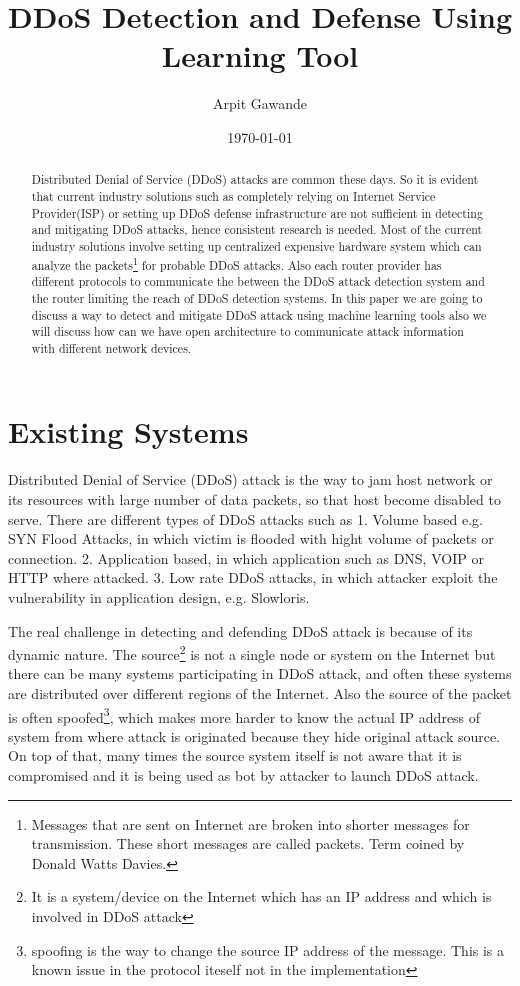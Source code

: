 \documentclass[10pt,oneside,a4paper]{article}
\author{Arpit Gawande}
\title{DDoS Detection and Defense Using Learning Tool}
\date{\today}
\begin{document}
\begin{abstract}
Distributed Denial of Service (DDoS) attacks are common these days\cite{ddosattacknews}. So it is evident that current industry solutions such as completely relying on Internet Service Provider(ISP) or setting up DDoS defense infrastructure are not sufficient in detecting and mitigating DDoS attacks, hence consistent research is needed. Most of the current industry solutions involve setting up centralized expensive hardware system which can analyze the packets\footnote{Messages that are sent on Internet are broken into shorter messages for transmission. These short messages are called packets. Term coined by Donald Watts Davies.} \cite{networkdatapacket} for probable DDoS attacks. Also each router provider has different protocols to communicate the between the DDoS attack detection system and the router limiting the reach of DDoS detection systems. In this paper we are going to discuss a way to detect and mitigate DDoS attack using machine learning tools also we will discuss how can we have open architecture to communicate attack information with different network devices.
\end{abstract}

\section{Existing Systems}

Distributed Denial of Service (DDoS) attack is the way to jam host network or its resources with large number of data packets, so that host become disabled to serve. There are different types of DDoS attacks such as
1. Volume based e.g. SYN Flood Attacks, in which victim is flooded with hight volume of packets or connection.
2. Application based, in which application such as DNS, VOIP or HTTP where attacked.
3. Low rate DDoS attacks, in which attacker exploit the vulnerability in application design, e.g. Slowloris.
\cite{DDoSAttacks}

The real challenge in detecting and defending DDoS attack is because of its dynamic nature. The source\footnote{It is a system/device on the Internet which has an IP address and which is involved in DDoS attack} is not a single node or system on the Internet but there can be many systems participating in DDoS attack, and often these systems are distributed over different regions of the Internet. Also the source of the packet is often spoofed\footnote{spoofing is the way to change the source IP address of the message. This is a known issue in the protocol iteself not in the implementation}\cite{ipspoofing}, which makes more harder to know the actual IP address of system from where attack is originated because they hide original attack source. On top of that, many times the source system itself is not aware that it is compromised and it is being used as bot\cite{bot} by attacker to launch DDoS attack.
\end{document}
